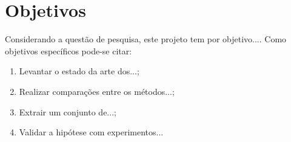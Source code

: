 \section{Objetivos}

Considerando a questão de pesquisa, este projeto tem por objetivo...\lipsum[70][2-5]. Como objetivos específicos pode-se citar:
\begin{enumerate}
    \item Levantar o estado da arte dos...\lipsum[70][2-5];
    \item Realizar comparações entre os métodos...\lipsum[71][2-5];
    \item Extrair um conjunto de...\lipsum[72][2-5];    
    \item Validar a hipótese com experimentos...\lipsum[73][2-5]
\end{enumerate}